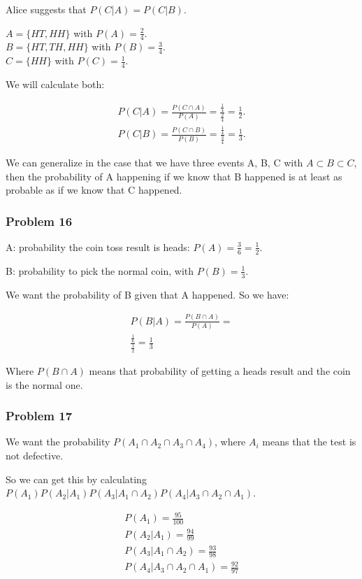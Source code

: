 \documentclass{article}
\begin{document}
Alice suggests that $P(C|A) = P(C|B)$.

$A = \{HT, HH\}$ with $P(A) = \frac{2}{4}$. \\
$B = \{HT, TH, HH\}$ with $P(B) = \frac{3}{4}$. \\
$C = \{HH\}$ with $P(C) = \frac{1}{4}$.

We will calculate both:

\begin{gather*}
    P(C|A) = \frac{P(C \cap A)}{P(A)} = \frac{\frac{1}{4}}{\frac{2}{4}} = \frac{1}{2}.\\
    P(C|B) = \frac{P(C \cap B)}{P(B)} = \frac{\frac{1}{4}}{\frac{3}{4}} = \frac{1}{3}.
\end{gather*}

We can generalize in the case that we have three events A, B, C with $A \subset B \subset C$, then the probability of A happening if we know that B happened is at least as probable as if we know that C happened.

\subsubsection*{Problem 16}

A: probability the coin toss result is heads: $P(A) = \frac{3}{6} = \frac{1}{2}$.

B: probability to pick the normal coin, with $P(B) = \frac{1}{3}$.

We want the probability of B given that A happened. 
So we have:

\begin{gather*}
    P(B|A) = \frac{P(B \cap A)}{P(A)} = \\
    \frac{\frac{1}{6}}{\frac{1}{2}} = \frac{1}{3}
\end{gather*}

Where $P(B \cap A)$ means that probability of getting a heads result and the coin is the normal one.

\subsubsection*{Problem 17}

We want the probability $P(A_1 \cap A_2 \cap A_3 \cap A_4)$, where $A_i$ means that the test is not defective.

So we can get this by calculating $P(A_1)P(A_2|A_1)P(A_3|A_1 \cap A_2)P(A_4| A_3 \cap A_2 \cap A_1)$.

\begin{gather*}
P(A_1) = \frac{95}{100} \\
P(A_2|A_1) = \frac{94}{99} \\
P(A_3|A_1 \cap A_2) = \frac{93}{98} \\
P(A_4| A_3 \cap A_2 \cap A_1) = \frac{92}{97}
\end{gather*}
\end{document}
